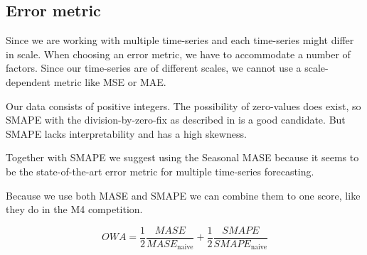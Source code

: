 \subsection{Error metric}
Since we are working with multiple time-series and each time-series might differ in scale.
When choosing an error metric, we have to accommodate a number of factors.
Since our time-series are of different scales, we cannot use a scale-dependent metric
like MSE or MAE.

Our data consists of positive integers. The possibility of zero-values does exist,
so SMAPE with the division-by-zero-fix as described in  is a good candidate.
But SMAPE lacks interpretability and has a high skewness.

Together with SMAPE we suggest using the Seasonal MASE because it seems to be the
state-of-the-art error metric for multiple time-series forecasting.

Because we use both MASE and SMAPE we can combine them to one score, like
they do in the M4 competition.

\begin{equation}
  \label{eq:OWA}
  OWA = \frac{1}{2} \frac{MASE}{MASE_{\text{naive}}} + \frac{1}{2} \frac{SMAPE}{SMAPE_{\text{naive}}}
\end{equation}
